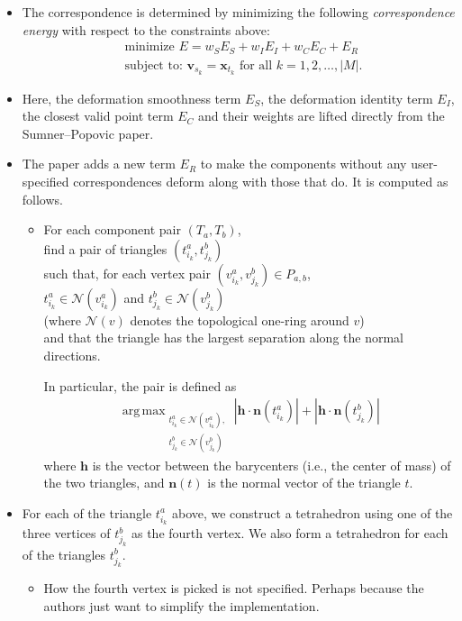 \documentclass[10pt]{article}
\newcommand{\ve}[1]{\mathbf{#1}}
\newcommand{\mcal}[1]{\mathcal{#1}}
\DeclareMathOperator*{\argmax}{arg\,max}
\begin{document}
\begin{itemize}
    \item The correspondence is determined by minimizing the following \emph{correspondence energy} with respect to the constraints above:
    \begin{align*}
        & \mbox{minimize } E = w_S E_S + w_I E_I + w_C E_C + E_R \\
        & \mbox{subject to: } \ve{v}_{s_k} = \ve{x}_{t_k} \mbox{ for all } k = 1, 2, \ldots, |M|.
    \end{align*}

    \item Here, the deformation smoothness term $E_S$, the deformation identity term $E_I$, the closest valid point term $E_C$ and their weights are lifted directly from the Sumner--Popovic paper.
    
    \item The paper adds a new term $E_R$ to make the components without any user-specified correspondences deform along with those that do. It is computed as follows.
    \begin{itemize}
        \item For each component pair $(T_a, T_b)$, \\
        find a pair of triangles $(t_{i_k}^a, t_{j_k}^b)$\\        
        such that, for each vertex pair $(v_{i_k}^a, v_{j_k}^b) \in P_{a,b}$,\\
        $t_{i_k}^a \in \mcal{N}(v_{i_k}^a)$ and $t_{j_k}^b \in \mcal{N}(v_{j_k}^b)$ \\
        (where $\mcal{N}(v)$ denotes the topological one-ring around $v$)\\ 
        and that the triangle has the largest separation along the normal directions.

        In particular, the pair is defined as
        \begin{align*}
            \argmax_{\substack{t_{i_k}^a \in \mcal{N}(v_{i_k}^a), \\ t_{j_k}^b \in \mcal{N}(v_{j_k}^b)}} | \ve{h} \cdot \ve{n}(t_{i_k}^a) | + | \ve{h} \cdot \ve{n}(t_{j_k}^b) |
        \end{align*}
        where $\ve{h}$ is the vector between the barycenters (i.e., the center of mass) of the two triangles, and $\ve{n}(t)$ is the normal vector of the triangle $t$.
    \end{itemize}

    \item For each of the triangle $t^a_{i_k}$ above, we construct a tetrahedron using one of the three vertices of $t_{j_k}^b$ as the fourth vertex. We also form a tetrahedron for each of the triangles $t^b_{j_k}$. 
    \begin{itemize}
        \item How the fourth vertex is picked is not specified. Perhaps because the authors just want to simplify the implementation.
        

\end{itemize}
\end{itemize}
\end{document}
